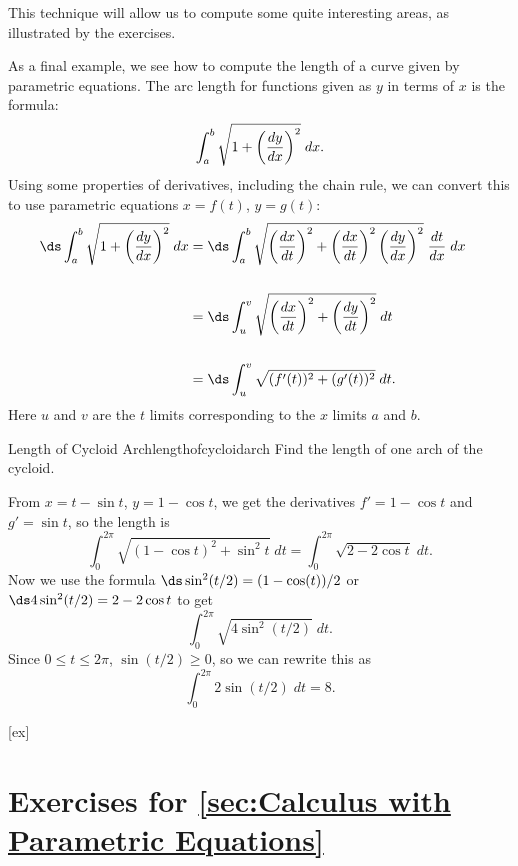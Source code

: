 This technique will allow us to compute some quite interesting areas,
as illustrated by the exercises.

As a final example, we see how to compute the length of a curve given
by parametric equations. %
The arc length for functions given as $y$ in terms of $x$ is
the formula:
$$\int_a^b \sqrt{1+\left({dy\over dx}\right)^2}\;dx.$$
Using some properties of derivatives, including the chain rule, we can
convert this to use parametric equations $x=f(t)$, $y=g(t)$:
\begin{eqnarray*}
  \ds\int_a^b \sqrt{1+\left({dy\over dx}\right)^2}\;dx&=
  \ds\int_a^b \sqrt{\left({dx\over dt}\right)^2
  +\left({dx\over dt}\right)^2\left({dy\over dx}\right)^2}\;{dt\over dx}\;dx\cr
  \\
  &=\ds\int_u^v \sqrt{\left({dx\over dt}\right)^2+
    \left({dy\over dt}\right)^2}\;dt\cr
    \\
  &=\ds\int_u^v \sqrt{(f'(t))^2+(g'(t))^2}\;dt.\cr
\end{eqnarray*}
Here $u$ and $v$ are the $t$ limits corresponding to the $x$ limits
$a$ and $b$.

\begin{example}{Length of Cycloid Arch}{lengthofcycloidarch}
 Find the length of one arch of the cycloid.
\end{example}

\begin{solution}
From $x=t-\sin t$, $y=1-\cos t$, we get the derivatives
$f'=1-\cos t$ and $g'=\sin t$, so the length is 
$$
  \int_0^{2\pi} \sqrt{(1-\cos t)^2+\sin^2 t}\;dt=
  \int_0^{2\pi} \sqrt{2-2\cos t}\;dt.
$$
Now we use the formula $\ds \sin^2(t/2)=(1-\cos(t))/2$ or
$\ds 4\sin^2(t/2)=2-2\cos t$ to get
$$\int_0^{2\pi} \sqrt{4\sin^2(t/2)}\;dt.$$
Since $0\le t\le2\pi$, $\sin(t/2)\ge 0$, so we can rewrite this as
$$\int_0^{2\pi} 2\sin(t/2)\;dt = 8.$$
\end{solution}


[ex]
\section*{Exercises for \ref{sec:Calculus with Parametric Equations}}

